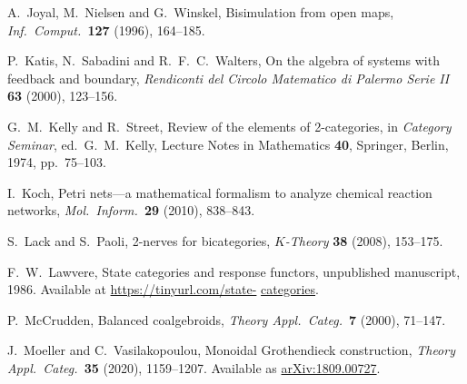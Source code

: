 \documentclass[reqno]{amsart}
\theoremstyle{definition}
\theoremstyle{remark}
\begin{document}
\begin{thebibliography}{100}
 A.\ Joyal, M.\ Nielsen and G.\ Winskel, Bisimulation from open maps, \textsl{Inf.\ Comput.\ }\textbf{127} (1996), 164--185.

 P.\ Katis, N.\ Sabadini and R.\ F.\ C.\ Walters, On the algebra of systems with feedback and boundary, \textsl{Rendiconti del Circolo Matematico di Palermo Serie II} \textbf{63} (2000), 123--156.

 G.\ M.\ Kelly and R.\ Street, Review of the elements of 2-categories, in \textsl{Category Seminar}, ed.\ G.\ M.\ Kelly, Lecture Notes in Mathematics \textbf{40}, Springer, Berlin, 1974, pp.\ 75--103.

 I.\ Koch, Petri nets---a mathematical formalism to analyze chemical reaction
networks, \textsl{Mol.\ Inform.\  }\textbf{29} (2010), 838--843.

 S.\ Lack and S.\ Paoli, 2-nerves for bicategories, \textsl{$K$-Theory} \textbf{38} (2008), 153--175.

 F.\ W.\ Lawvere, State categories and response functors, unpublished manuscript, 1986.  Available at \href{https://tinyurl.com/state}{https://tinyurl.com/state-}  \href{https://tinyurl.com/state-categories}{categories}.





 P.\ McCrudden, Balanced coalgebroids, \textsl{Theory Appl.\ Categ.\ }\textbf{7} (2000), 71--147.

 J.\ Moeller and C.\ Vasilakopoulou, Monoidal Grothendieck construction, \textsl{Theory Appl.\ Categ.\ }\textbf{35} (2020), 1159--1207. Available as \href{https://arxiv.org/abs/1809.00727}{arXiv:1809.00727}.


\end{thebibliography}
\end{document}
